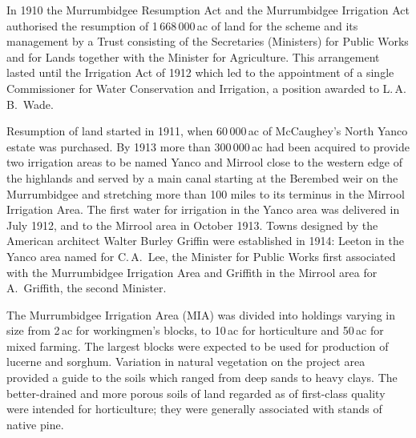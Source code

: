 In 1910 the Murrumbidgee Resumption Act and the Murrumbidgee
Irrigation Act authorised the resumption of 1\,668\,000\,ac of land
for the scheme and its management by a Trust consisting of the
Secretaries (Ministers) for Public Works and for Lands together with
the Minister for Agriculture. This arrangement lasted
until the Irrigation Act of 1912 which led to the appointment of a
single Commissioner for Water Conservation and Irrigation, a position
awarded to L.\,A.\,B.~Wade.

Resumption of land started in 1911, when 60\,000\,ac of McCaughey's
North Yanco estate was purchased.  By 1913 more than 300\,000\,ac
had been acquired to provide two irrigation areas to be named Yanco
and Mirrool close to the western edge of the highlands and served by a
main canal starting at the Berembed weir on the Murrumbidgee and
stretching more than 100 miles to its terminus in the Mirrool
Irrigation Area. The first water for irrigation in the Yanco area was
delivered in July 1912, and to the Mirrool area in October 1913.
Towns designed by the American architect Walter Burley Griffin were
established in 1914: Leeton in the Yanco area named for C.\,A.~Lee,
the Minister for Public Works first associated with the Murrumbidgee
Irrigation Area and Griffith in the Mirrool area for A.~Griffith, the
second Minister.

The Murrumbidgee Irrigation Area (MIA) was divided into holdings
varying in size from 2\,ac for workingmen's blocks, to 10\,ac for
horticulture and 50\,ac for mixed farming.  The largest blocks were
expected to be used for production of lucerne and sorghum.  Variation
in natural vegetation on the project area provided a guide to the
soils which ranged from deep sands to heavy clays.  The better-drained
and more porous soils of land regarded as of first-class quality were
intended for horticulture; they were generally associated with stands
of native pine.

